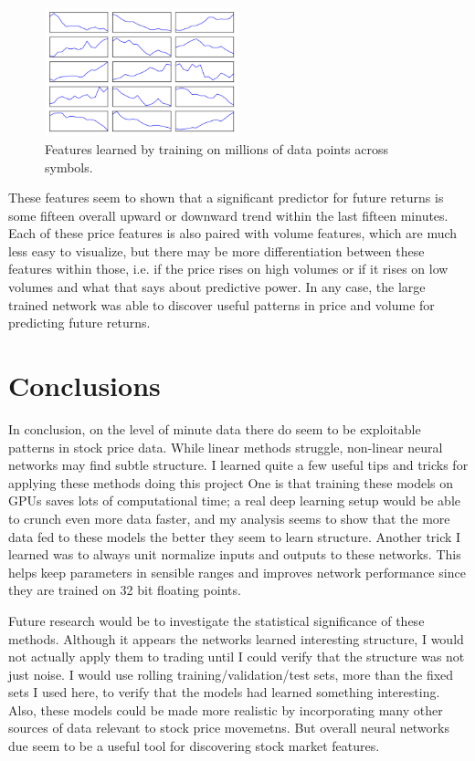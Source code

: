 \documentclass{article}
\begin{document}
\begin{figure}[ht]
	\centering
    \includegraphics[width=0.5\textwidth]{mlp_feats_big}
    \caption{Features learned by training on millions of data points across symbols.}
    \label{fig:big_feats}
\end{figure}

These features seem to shown that a significant predictor for future returns is some
fifteen overall upward or downward trend within the last fifteen minutes. Each of
these price features is also paired with volume features, which are much less easy
to visualize, but there may be more differentiation between these features within
those, i.e. if the price rises on high volumes or if it rises on low volumes and
what that says about predictive power. In any case, the large trained network
was able to discover useful patterns in price and volume for predicting future
returns.

\section{Conclusions}

In conclusion, on the level of minute data there do seem to be exploitable patterns
in stock price data. While linear methods struggle, non-linear neural networks may
find subtle structure. I learned quite a few useful tips and tricks 
for applying these methods  doing this project
One is that training these models on GPUs saves lots of computational time; a real
deep learning setup would be able to crunch even more data faster, and my analysis
seems to show that the more data fed to these models the better they seem to learn
structure. Another trick I learned was to always unit normalize inputs and outputs
to these networks. This helps keep parameters in sensible ranges and improves network
performance since they are trained on 32 bit floating points. 

Future research would be to investigate the statistical significance of these
methods. Although it appears the networks learned interesting structure, I would
not actually apply them to trading until I could verify that the structure was not
just noise. I would use rolling training/validation/test sets, more than the
fixed sets I used here, to verify that the models had learned something interesting.
Also, these models could be made more realistic by incorporating many other sources
of data relevant to stock price movemetns. But overall neural networks due
seem to be a useful tool for discovering stock market features.

{}

\nocite{*}
\end{document}
